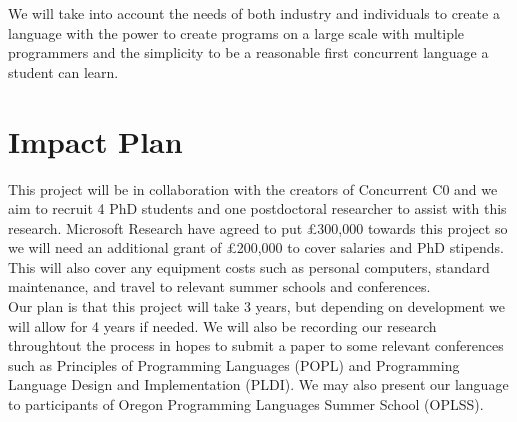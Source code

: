\documentclass[11pt]{article}
\begin{document}
    \noindent
    We will take into account the needs of both industry and individuals to create a language with the power to 
    create programs on a large scale with multiple programmers and the simplicity to be a reasonable first concurrent 
    language a student can learn. \\
    
    \section*{Impact Plan}


    This project will be in collaboration with the creators of Concurrent C0 \supercite{C0} and we aim to recruit 4 
    PhD students and one postdoctoral researcher to assist with this research. Microsoft Research have 
    agreed to put £300,000 towards this project so we will need an additional grant of £200,000 to cover salaries and 
    PhD stipends. This will also cover any equipment costs such as personal computers, standard maintenance, 
    and travel to relevant summer schools and conferences. \\
    
    \noindent
    Our plan is that this project will take 3 years, but depending on development we will allow for 4 years 
    if needed. We will also be recording our research throughtout the process in hopes to submit a paper to 
    some relevant conferences such as Principles of Programming Languages \supercite{popl} (POPL) and 
    Programming Language Design and Implementation \supercite{pldi} (PLDI). We may also present our language 
    to participants of Oregon Programming Languages Summer School \supercite{Oregon} (OPLSS). \\
\end{document}
